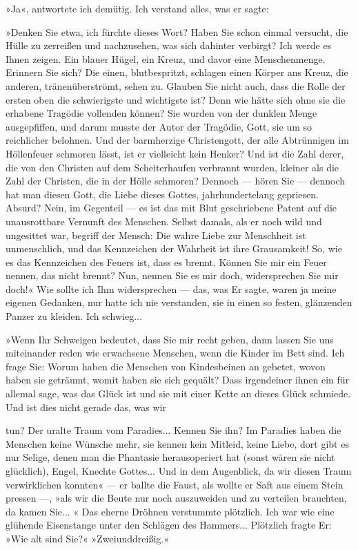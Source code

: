 »Ja«, antwortete ich demütig. Ich verstand alles, was er sagte:

»Denken Sie etwa, ich fürchte dieses Wort? Haben Sie schon einmal
versucht, die Hülle zu zerreißen und nachzusehen, was sich dahinter
verbirgt? Ich werde es Ihnen zeigen. Ein blauer Hügel, ein Kreuz,
und davor eine Menschenmenge. Erinnern Sie sich? Die einen,
blutbespritzt, schlagen einen Körper ans Kreuz, die anderen,
tränenüberströmt, sehen zu. Glauben Sie nicht auch, dass die Rolle
der ersten oben die schwierigste und wichtigste ist? Denn wie hätte
sich ohne sie die erhabene Tragödie vollenden können? Sie wurden
von der dunklen Menge ausgepfiffen, und darum musste der Autor der
Tragödie, Gott, sie um so reichlicher belohnen. Und der barmherzige
Christengott, der alle Abtrünnigen im Höllenfeuer schmoren lässt,
ist er vielleicht kein Henker? Und ist die Zahl derer, die von den
Christen auf dem Scheiterhaufen verbrannt wurden, kleiner als die
Zahl der Christen, die in der Hölle schmoren? Dennoch — hören Sie —
dennoch hat man diesen Gott, die Liebe dieses Gottes,
jahrhundertelang gepriesen. Absurd? Nein, im Gegenteil — es ist das
mit Blut geschriebene Patent auf die unausrottbare Vernunft des
Menschen. Selbst damals, als er noch wild und ungesittet war,
begriff der Mensch: Die wahre Liebe zur Menschheit ist
unmenschlich, und das Kennzeichen der Wahrheit ist ihre
Grausamkeit! So, wie es das Kennzeichen des Feuers ist, dass es
brennt. Können Sie mir ein Feuer nennen, das nicht brennt? Nun,
nennen Sie es mir doch, widersprechen Sie mir doch!« Wie sollte ich
Ihm widersprechen — das, was Er sagte, waren ja meine eigenen
Gedanken, nur hatte ich nie verstanden, sie in einen so festen,
glänzenden Panzer zu kleiden. Ich schwieg...

»Wenn Ihr Schweigen bedeutet, dass Sie mir recht geben, dann lassen
Sie uns miteinander reden wie erwachsene Menschen, wenn die Kinder
im Bett sind. Ich frage Sie: Worum haben die Menschen von
Kindesbeinen an gebetet, wovon haben sie geträumt, womit haben sie
sich gequält? Dass irgendeiner ihnen ein für allemal sage, was das
Glück ist und sie mit einer Kette an dieses Glück schmiede. Und ist
dies nicht gerade das, was wir

tun? Der uralte Traum vom Paradies... Kennen Sie ihn? Im Paradies
haben die Menschen keine Wünsche mehr, sie kennen kein Mitleid,
keine Liebe, dort gibt es nur Selige, denen man die Phantasie
herausoperiert hat (sonst wären sie nicht glücklich), Engel,
Knechte Gottes... Und in dem Augenblick, da wir diesen Traum
verwirklichen konnten« — er ballte die Faust, als wollte er Saft
aus einem Stein pressen —, »als wir die Beute nur noch auszuweiden
und zu verteilen brauchten, da kamen Sie... « Das eherne Dröhnen
verstummte plötzlich. Ich war wie eine glühende Eisenstange unter
den Schlägen des Hammers... Plötzlich fragte Er: »Wie alt sind
Sie?« »Zweiunddreißig.«

